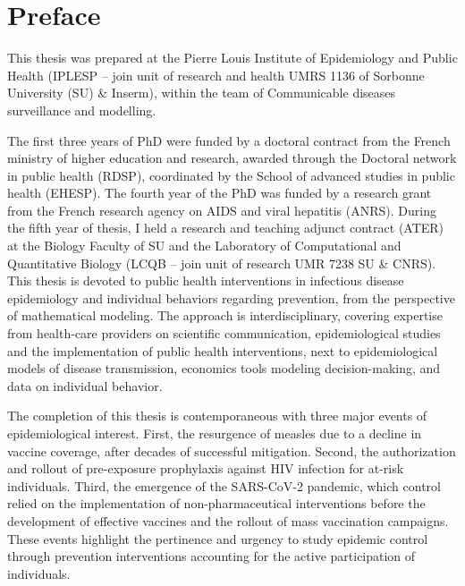 \chapter*{Preface} 

This thesis was prepared at the Pierre Louis Institute of Epidemiology and Public Health (IPLESP -- join unit of research and health UMRS 1136 of Sorbonne University (SU) \& Inserm), within the team of Communicable diseases surveillance and modelling.

The first three years of PhD were funded by a doctoral contract from the French ministry of higher education and research, awarded through the Doctoral network in public health (RDSP), coordinated by the School of advanced studies in public health (EHESP). The fourth year of the PhD was funded by a research grant from the French research agency on AIDS and viral hepatitis (ANRS). During the fifth year of thesis, I held a research and teaching adjunct contract (ATER) at the Biology Faculty of SU and the Laboratory of Computational and Quantitative Biology (LCQB -- join unit of research UMR 7238 SU \& CNRS).\\

This thesis is devoted to public health interventions in infectious disease epidemiology and individual behaviors regarding prevention, from the perspective of mathematical modeling. The approach is interdisciplinary, covering expertise from health-care providers on scientific communication, epidemiological studies and the implementation of public health interventions, next to epidemiological models of disease transmission, economics tools modeling decision-making, and data on individual behavior.

The completion of this thesis is contemporaneous with three major events of epidemiological interest. First, the resurgence of measles due to a decline in vaccine coverage, after decades of successful mitigation. Second, the authorization and rollout of pre-exposure prophylaxis against HIV infection for at-risk individuals. Third, the emergence of the SARS-CoV-2 pandemic, which control relied on the implementation of non-pharmaceutical interventions before the development of effective vaccines and the rollout of mass vaccination campaigns. These events highlight the pertinence and urgency to study epidemic control through prevention interventions accounting for the active participation of individuals. 

